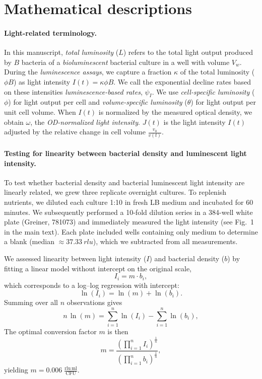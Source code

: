 \section{Mathematical descriptions}\label{sec:math}

\paragraph{Light-related terminology.}
In this manuscript, \emph{total luminosity} ($L$) refers to the total light output produced by $B$ bacteria of a \emph{bioluminescent} bacterial culture in a well with volume $V_w$.
During the \emph{luminescence assays}, we capture a fraction $\kappa$ of the total luminosity ($\phi B$) as light intensity $I(t) = \kappa \phi B$.
We call the exponential decline rates based on these intensities \emph{luminescence-based rates}, $\psi_I$.
We use \emph{cell-specific luminosity} ($\phi$) for light output per cell and \emph{volume-specific luminosity} ($\theta$) for light output per unit cell volume.
When $I(t)$ is normalized by the measured optical density, we obtain $\omega$, the \emph{OD-normalized light intensity}.
$J(t)$ is the light intensity $I(t)$ adjusted by the relative change in cell volume $\frac{v_0}{v(t)}$.

\paragraph{Testing for linearity between bacterial density and luminescent light intensity.}

To test whether bacterial density and bacterial luminescent light intensity are linearly related, we grew three replicate overnight cultures.
To replenish nutrients, we diluted each culture 1:10 in fresh LB medium and incubated for 60 minutes.
We subsequently performed a 10-fold dilution series in a 384-well white plate (Greiner, 781073) and immediately measured the light intensity (see Fig.~1 in the main text).
Each plate included wells containing only medium to determine a blank (median \(\approx \SI{37.33}{rlu}\)), which we subtracted from all measurements.

We assessed linearity between light intensity ($I$) and bacterial density ($b$) by fitting a linear model without intercept on the original scale,
\[
  I_i = m \cdot b_i,
\]
which corresponds to a log–log regression with intercept:
\[
  \ln(I_i) = \ln(m) + \ln(b_i).
\]
Summing over all \(n\) observations gives
\[
  n\,\ln(m) = \sum_{i=1}^n \ln(I_i) - \sum_{i=1}^n \ln(b_i),
\]
The optimal conversion factor \(m\) is then
\[
  m = \frac{\left(\prod_{i=1}^n I_i\right)^{\frac{1}{n}}}{\left(\prod_{i=1}^n b_i\right)^{\frac{1}{n}}},
\]
yielding \(m = 0.006\;\frac{\mathrm{rlu}\,\mathrm{ml}}{\mathrm{CFU}}\).

